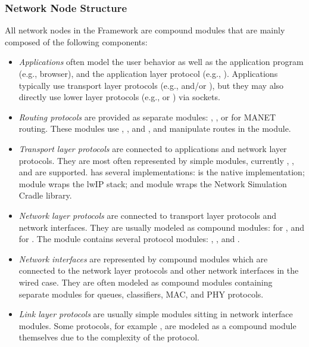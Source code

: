 \subsubsection*{Network Node Structure}

All network nodes in the \inet Framework are \omnet compound modules that are mainly composed of the following components:

\begin{itemize}
        \item \emph{Applications} often model the user behavior as well as the application program (e.g., browser), and the application layer protocol (e.g., ). Applications typically use transport layer protocols (e.g.,  and/or ), but they may also directly use lower layer protocols (e.g.,  or ) via sockets.
        \item \emph{Routing protocols} are provided as separate modules: , , or  for MANET routing. These modules use , , and , and manipulate routes in the  module.
        \item \emph{Transport layer protocols} are connected to applications and network layer protocols. They are most often represented by simple modules, currently , , and  are supported.  has several implementations:  is the \omnet native implementation;  module wraps the lwIP  stack; and  module wraps the Network Simulation Cradle library.
        \item \emph{Network layer protocols} are connected to transport layer protocols and network interfaces. They are usually modeled as compound modules:  for , and  for . The  module contains several protocol modules: , , and .
        \item \emph{Network interfaces} are represented by compound modules which are connected to the network layer protocols and other network interfaces in the wired case. They are often modeled as compound modules containing separate modules for queues, classifiers, MAC, and PHY protocols.
        \item \emph{Link layer protocols} are usually simple modules sitting in network interface modules. Some protocols, for example , are modeled as a compound module themselves due to the complexity of the protocol.

\end{itemize}

